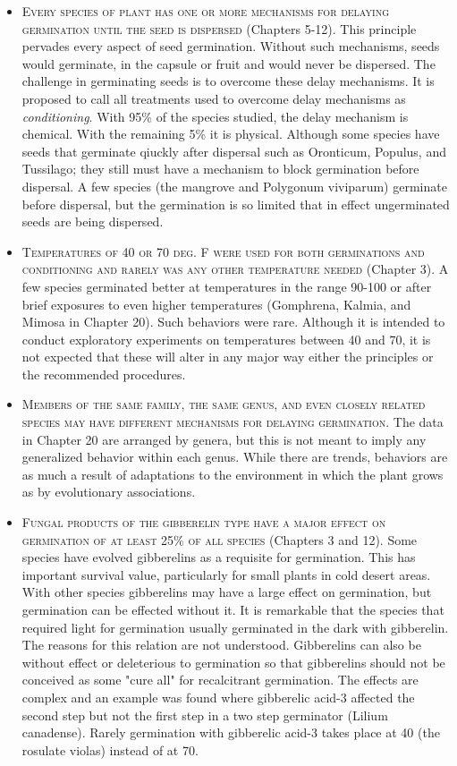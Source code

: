 \begin{itemize}
\item \textsc{Every species of plant has one or more mechanisms
for delaying germination until the seed is dispersed}
(Chapters 5-12). This principle pervades every aspect of seed germination. Without
such mechanisms, seeds would germinate, in the capsule or fruit and would never be
dispersed. The challenge in germinating seeds is to overcome these delay
mechanisms. It is proposed to call all treatments used to overcome delay mechanisms
as \textit{conditioning}. With 95\% of the species studied, the delay mechanism is chemical.
With the remaining 5\% it is physical. Although some species have seeds that
germinate qiuckly after dispersal such as Oronticum, Populus, and Tussilago; they still
must have a mechanism to block germination before dispersal. A few species (the
mangrove and Polygonum viviparum) germinate before dispersal, but the germination
is so limited that in effect ungerminated seeds are being dispersed.

\item \textsc{Temperatures of 40 or 70 deg. F were used for both germinations and
conditioning and rarely was any other temperature needed} (Chapter 3). A few
species germinated better at temperatures in the range 90-100 or after brief
exposures to even higher temperatures (Gomphrena, Kalmia, and Mimosa in Chapter
20). Such behaviors were rare. Although it is intended to conduct exploratory
experiments on temperatures between 40 and 70, it is not expected that these
will alter in any major way either the principles or the recommended
procedures.

\item \textsc{Members of the same family, the same genus, and even closely related
species may have different mechanisms for delaying germination.} The data in
Chapter 20 are arranged by genera, but this is not meant to imply any
generalized behavior within each genus. While there are trends, behaviors are
as much a result of adaptations to the environment in which the plant grows as
by evolutionary associations.

\item \textsc{Fungal products of the gibberelin type have a major effect on germination
of at least 25\% of all species} (Chapters 3 and 12). Some species have evolved gibberelins as a requisite for
germination. This has important survival value, particularly for small plants in cold
desert areas. With other species gibberelins may have a large effect on germination,
but germination can be effected without it. It is remarkable that the species that
required light for germination usually germinated in the dark with gibberelin. The
reasons for this relation are not understood. Gibberelins can also be without effect or
deleterious to germination so that gibberelins should not be conceived as some "cure
all" for recalcitrant germination. The effects are complex and an example was found
where gibberelic acid-3 affected the second step but not the first step in a two step
germinator (Lilium canadense). Rarely germination with gibberelic acid-3 takes place
at 40 (the rosulate violas) instead of at 70.


\end{itemize}
